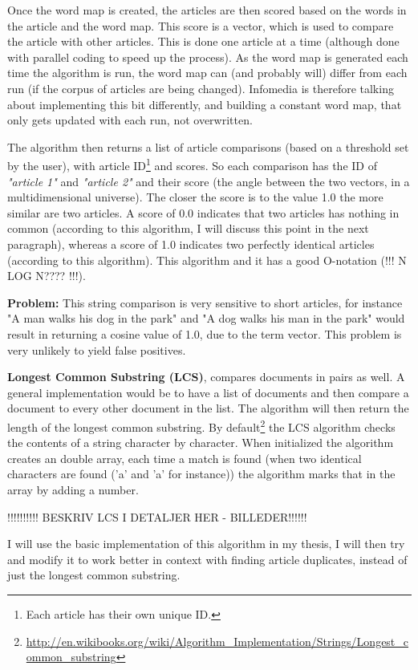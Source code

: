Once the word map is created, the articles are then scored based on the words in the article and the word map. This score is a vector, which is used to compare the article with other articles. This is done one article at a time (although done with parallel coding to speed up the process). As the word map is generated each time the algorithm is run, the word map can (and probably will) differ from each run (if the corpus of articles are being changed). Infomedia is therefore talking about implementing this bit differently, and building a constant word map, that only gets updated with each run, not overwritten.

The algorithm then returns a list of article comparisons (based on a threshold set by the user), with article ID\footnote{Each article has their own unique ID.} and scores. So each comparison has the ID of \textit{"article 1"} and \textit{"article 2"} and their score (the angle between the two vectors, in a multidimensional universe). The closer the score is to the value 1.0 the more similar are two articles. A score of 0.0 indicates that two articles has nothing in common (according to this algorithm, I will discuss this point in the next paragraph), whereas a score of 1.0 indicates two perfectly identical articles (according to this algorithm). This algorithm and it has a good O-notation (!!! N LOG N???? !!!).

\textbf{Problem:} This string comparison is very sensitive to short articles, for instance "A man walks his dog in the park" and "A dog walks his man in the park" would result in returning a cosine value of 1.0, due to the term vector. This problem is very unlikely to yield false positives.

\textbf{Longest Common Substring (LCS)}, compares documents in pairs as well. A general implementation would be to have a list of documents and then compare a document to every other document in the list. The algorithm will then return the length of the longest common substring. By default\footnote{\url{http://en.wikibooks.org/wiki/Algorithm_Implementation/Strings/Longest_common_substring}} the LCS algorithm checks the contents of a string character by character. When initialized the algorithm creates an double array, each time a match is found (when two identical characters are found ('a' and 'a' for instance)) the algorithm marks that in the array by adding a number. 

!!!!!!!!!! BESKRIV LCS I DETALJER HER - BILLEDER!!!!!!

I will use the basic implementation of this algorithm in my thesis, I will then try and modify it to work better in context with finding article duplicates, instead of just the longest common substring.

